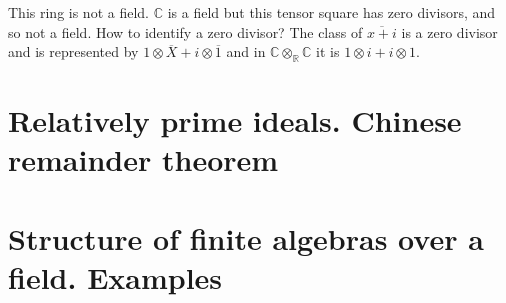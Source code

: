 This ring is not a field. $\mathbb{C}$ is a field but this tensor square has zero divisors, and so not a field. How to identify a zero divisor? The class of $\overbar{x+i}$ is a zero divisor and is represented by $1\otimes \overbar{X}+ i\otimes\overbar{1}$ and in $\mathbb{C}\otimes_{\mathbb{R}} \mathbb{C}$ it is $1\otimes i + i\otimes 1$.

\section{Relatively prime ideals. Chinese remainder theorem}



\section{Structure of finite algebras over a field. Examples}

